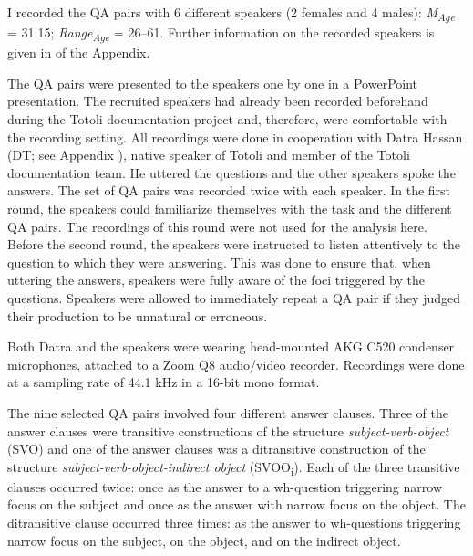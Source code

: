 I recorded the QA pairs  with 6 different speakers (2 females and 4 males): \textit{M\textsubscript{Age}} = 31.15; \textit{Range\textsubscript{Age}} = 26--61. Further information on the recorded speakers is given in   of the Appendix. 

The QA pairs were presented to the speakers one by one in a PowerPoint presentation. The recruited speakers had already been recorded beforehand during the Totoli documentation project and, therefore, were  comfortable with the recording setting. All recordings were done in cooperation with Datra Hassan (DT; see Appendix ), native speaker of Totoli and member of the Totoli documentation team. He uttered the questions and the other speakers spoke the answers. The set of QA pairs was recorded twice with each speaker. In the first round, the speakers could familiarize themselves with the task and the different QA pairs. The recordings of this round were not used for the analysis here. Before the second round, the speakers were instructed  to listen attentively to the question to which they were answering. This was done to ensure that, when uttering the answers, speakers were fully aware of the foci triggered by the questions. Speakers were allowed to immediately repeat a QA pair if they judged their production to be unnatural or erroneous.

Both Datra and the speakers were wearing head-mounted AKG C520 condenser microphones, attached to a Zoom Q8 audio/video recorder. Recordings were done at a sampling rate of 44.1 kHz in a 16-bit mono format.




The nine selected QA pairs involved four different answer clauses. Three of the answer clauses were transitive constructions of the structure \textit{subject-verb-object} (SVO) and one of the answer clauses was a ditransitive construction of the structure \textit{subject-verb-object-indirect object} (SVOO\textsubscript{i}). Each of the three transitive clauses occurred twice: once as the answer to a wh-question triggering narrow focus on the subject and once as the answer with narrow focus on the object. The ditransitive clause occurred three times: as the answer to wh-questions triggering narrow focus on the subject, on the object, and on the indirect object.

